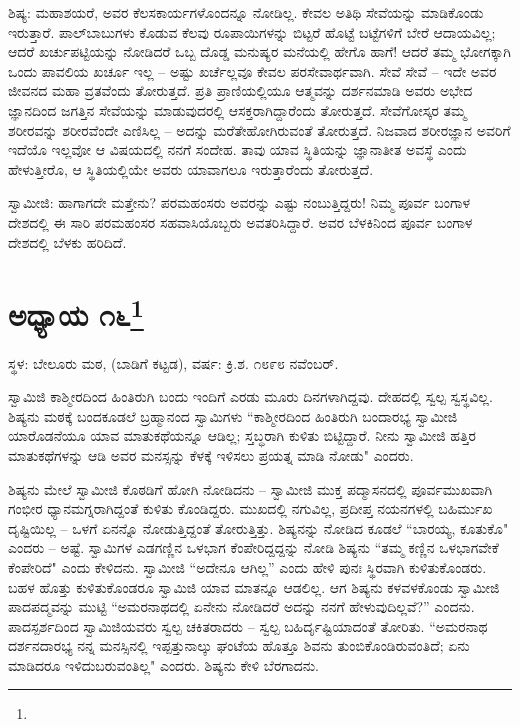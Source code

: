 ಶಿಷ್ಯ: ಮಹಾಶಯರೆ, ಅವರ ಕೆಲಸಕಾರ್ಯಗಳೊಂದನ್ನೂ ನೋಡಿಲ್ಲ. ಕೇವಲ ಅತಿಥಿ ಸೇವೆಯನ್ನು ಮಾಡಿಕೊಂಡು ಇರುತ್ತಾರೆ. ಪಾಲ್‌ಬಾಬುಗಳು ಕೊಡುವ ಕೆಲವು ರೂಪಾಯಿಗಳನ್ನು ಬಿಟ್ಟರೆ ಹೊಟ್ಟೆ ಬಟ್ಟೆಗಳಿಗೆ ಬೇರೆ ಆದಾಯವಿಲ್ಲ; ಆದರೆ ಖರ್ಚುಪಟ್ಟಿಯನ್ನು ನೋಡಿದರೆ ಒಬ್ಬ ದೊಡ್ಡ ಮನುಷ್ಯರ ಮನೆಯಲ್ಲಿ ಹೇಗೊ ಹಾಗೆ! ಆದರೆ ತಮ್ಮ ಭೋಗಕ್ಕಾಗಿ ಒಂದು ಪಾವಲಿಯ ಖರ್ಚೂ ಇಲ್ಲ – ಅಷ್ಟು ಖರ್ಚೆಲ್ಲವೂ ಕೇವಲ ಪರಸೇವಾರ್ಥವಾಗಿ. ಸೇವೆ ಸೇವೆ – ಇದೇ ಅವರ ಜೀವನದ ಮಹಾ ವ್ರತವೆಂದು ತೋರುತ್ತದೆ. ಪ್ರತಿ ಪ್ರಾಣಿಯಲ್ಲಿಯೂ ಆತ್ಮವನ್ನು ದರ್ಶನಮಾಡಿ ಅವರು ಅಭೇದ ಜ್ಞಾನದಿಂದ ಜಗತ್ತಿನ ಸೇವೆಯನ್ನು ಮಾಡುವುದರಲ್ಲಿ ಆಸಕ್ತರಾಗಿದ್ದಾರೆಂದು ತೋರುತ್ತದೆ. ಸೇವೆಗೋಸ್ಕರ ತಮ್ಮ ಶರೀರವನ್ನು ಶರೀರವೆಂದೇ ಎಣಿಸಿಲ್ಲ – ಅದನ್ನು ಮರೆತೇಹೋಗಿರುವಂತೆ ತೋರುತ್ತದೆ. ನಿಜವಾದ ಶರೀರಜ್ಞಾನ ಅವರಿಗೆ ಇದೆಯೊ ಇಲ್ಲವೋ ಆ ವಿಷಯದಲ್ಲಿ ನನಗೆ ಸಂದೇಹ. ತಾವು ಯಾವ ಸ್ಥಿತಿಯನ್ನು ಜ್ಞಾನಾತೀತ ಅವಸ್ಥೆ ಎಂದು ಹೇಳುತ್ತೀರೊ, ಆ ಸ್ಥಿತಿಯಲ್ಲಿಯೇ ಅವರು ಯಾವಾಗಲೂ ಇರುತ್ತಾರೆಂದು ತೋರುತ್ತದೆ.

ಸ್ವಾಮೀಜಿ: ಹಾಗಾಗದೇ ಮತ್ತೇನು? ಪರಮಹಂಸರು ಅವರನ್ನು ಎಷ್ಟು ನಂಬುತ್ತಿದ್ದರು! ನಿಮ್ಮ ಪೂರ್ವ ಬಂಗಾಳ ದೇಶದಲ್ಲಿ ಈ ಸಾರಿ ಪರಮಹಂಸರ ಸಹವಾಸಿಯೊಬ್ಬರು ಅವತರಿಸಿದ್ದಾರೆ. ಅವರ ಬೆಳಕಿನಿಂದ ಪೂರ್ವ ಬಂಗಾಳ ದೇಶದಲ್ಲಿ ಬೆಳಕು ಹರಿದಿದೆ.

\chapter[ಅಧ್ಯಾಯ ೧೬]{ಅಧ್ಯಾಯ ೧೬\protect\footnote{}}

\centerline{ಸ್ಥಳ: ಬೇಲೂರು ಮಠ, (ಬಾಡಿಗೆ ಕಟ್ಟಡ), ವರ್ಷ: ಕ್ರಿ.ಶ. ೧೮೯೮ ನವೆಂಬರ್.}

ಸ್ವಾಮಿಜಿ ಕಾಶ್ಮೀರದಿಂದ ಹಿಂತಿರುಗಿ ಬಂದು ಇಂದಿಗೆ ಎರಡು ಮೂರು ದಿನಗಳಾಗಿದ್ದವು. ದೇಹದಲ್ಲಿ ಸ್ವಲ್ಪ ಸ್ವಸ್ಥವಿಲ್ಲ. ಶಿಷ್ಯನು ಮಠಕ್ಕೆ ಬಂದಕೂಡಲೆ ಬ್ರಹ್ಮಾನಂದ ಸ್ವಾಮಿಗಳು “ಕಾಶ್ಮೀರದಿಂದ ಹಿಂತಿರುಗಿ ಬಂದಾರಭ್ಯ ಸ್ವಾಮೀಜಿ ಯಾರೊಡನೆಯೂ ಯಾವ ಮಾತುಕಥೆಯನ್ನೂ ಆಡಿಲ್ಲ; ಸ್ತಬ್ಧರಾಗಿ ಕುಳಿತು ಬಿಟ್ಟಿದ್ದಾರೆ. ನೀನು ಸ್ವಾಮೀಜಿ ಹತ್ತಿರ ಮಾತುಕಥೆಗಳನ್ನು ಆಡಿ ಅವರ ಮನಸ್ಸನ್ನು ಕೆಳಕ್ಕೆ ಇಳಿಸಲು ಪ್ರಯತ್ನ ಮಾಡಿ ನೋಡು" ಎಂದರು.

ಶಿಷ್ಯನು ಮೇಲೆ ಸ್ವಾಮೀಜಿ ಕೊಠಡಿಗೆ ಹೋಗಿ ನೋಡಿದನು – ಸ್ವಾಮೀಜಿ ಮುಕ್ತ ಪದ್ಮಾಸನದಲ್ಲಿ ಪೂರ್ವಮುಖವಾಗಿ ಗಂಭೀರ ಧ್ಯಾನಮಗ್ನರಾಗಿದ್ದಂತೆ ಕುಳಿತು ಕೊಂಡಿದ್ದರು. ಮುಖದಲ್ಲಿ ನಗುವಿಲ್ಲ, ಪ್ರದೀಪ್ತ ನಯನಗಳಲ್ಲಿ ಬಹಿರ್ಮುಖ ದೃಷ್ಟಿಯಿಲ್ಲ – ಒಳಗೆ ಏನನ್ನೊ ನೋಡುತ್ತಿದ್ದಂತೆ ತೋರುತ್ತಿತ್ತು. ಶಿಷ್ಯನನ್ನು ನೋಡಿದ ಕೂಡಲೆ “ಬಾರಯ್ಯ, ಕೂತುಕೊ" ಎಂದರು – ಅಷ್ಟೆ. ಸ್ವಾಮಿಗಳ ಎಡಗಣ್ಣಿನ ಒಳಭಾಗ ಕೆಂಪೇರಿದ್ದದ್ದನ್ನು ನೋಡಿ ಶಿಷ್ಯನು “ತಮ್ಮ ಕಣ್ಣಿನ ಒಳಭಾಗವೇಕೆ ಕೆಂಪೇರಿದೆ" ಎಂದು ಕೇಳಿದನು. ಸ್ವಾಮೀಜಿ “ಅದೇನೂ ಆಗಿಲ್ಲ” ಎಂದು ಹೇಳಿ ಪುನಃ ಸ್ಥಿರವಾಗಿ ಕುಳಿತುಕೊಂಡರು. ಬಹಳ ಹೊತ್ತು ಕುಳಿತುಕೊಂಡರೂ ಸ್ವಾಮಿಜಿ ಯಾವ ಮಾತನ್ನೂ ಆಡಲಿಲ್ಲ. ಆಗ ಶಿಷ್ಯನು ಕಳವಳಕೊಂಡು ಸ್ವಾಮೀಜಿ ಪಾದಪದ್ಮವನ್ನು ಮುಟ್ಟಿ “ಅಮರನಾಥದಲ್ಲಿ ಏನೇನು ನೋಡಿದರೆ ಅದನ್ನು ನನಗೆ ಹೇಳುವುದಿಲ್ಲವೆ?” ಎಂದನು. ಪಾದಸ್ಪರ್ಶದಿಂದ ಸ್ವಾಮಿಜಿಯವರು ಸ್ವಲ್ಪ ಚಕಿತರಾದರು – ಸ್ವಲ್ಪ ಬಹಿರ್ದೃಷ್ಟಿಯಾದಂತೆ ತೋರಿತು. “ಅಮರನಾಥ ದರ್ಶನದಾರಭ್ಯ ನನ್ನ ಮನಸ್ಸಿನಲ್ಲಿ ಇಪ್ಪತ್ತುನಾಲ್ಕು ಘಂಟೆಯ ಹೊತ್ತೂ ಶಿವನು ತುಂಬಿಕೊಂಡಿರುವಂತಿದೆ; ಏನು ಮಾಡಿದರೂ ಇಳಿದುಬರುವಂತಿಲ್ಲ" ಎಂದರು. ಶಿಷ್ಯನು ಕೇಳಿ ಬೆರಗಾದನು.

